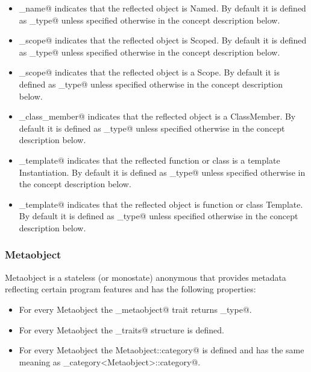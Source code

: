 \begin{itemize}
\item{\verb@has_name@} indicates that the reflected object is {\metaobject Named}.
By default it is defined as \verb@false_type@ unless specified otherwise in the
concept description below.

\item{\verb@has_scope@} indicates that the reflected object is {\metaobject Scoped}.
By default it is defined as \verb@false_type@ unless specified otherwise in the
concept description below.

\item{\verb@is_scope@} indicates that the reflected object is a {\metaobject Scope}.
By default it is defined as \verb@false_type@ unless specified otherwise in the
concept description below.

\item{\verb@is_class_member@} indicates that the reflected object is a {\metaobject ClassMember}.
By default it is defined as \verb@false_type@ unless specified otherwise in the
concept description below.

\item{\verb@has_template@} indicates that the reflected function or class is
a template {\metaobject Instantiation}.
By default it is defined as \verb@false_type@ unless specified otherwise in the
concept description below.

\item{\verb@is_template@} indicates that the reflected object is function or class {\metaobject Template}.
By default it is defined as \verb@false_type@ unless specified otherwise in the
concept description below.
\end{itemize}

\subsubsection{Metaobject}

{\metaobject Metaobject} is a stateless (or monostate) anonymous \verb@struct@ that provides
metadata reflecting certain program features and has the following properties:

\begin{itemize}
\item For every {\metaobject Metaobject} the \verb@is_metaobject@ trait returns \verb@true_type@.
\item For every {\metaobject Metaobject} the \verb@metaobject_traits@ structure is defined.
\item For every {\metaobject Metaobject} the {\verb@typedef Metaobject::category@} is defined
and has the same meaning as \verb@metaobject_category<Metaobject>::category@.
\end{itemize}

